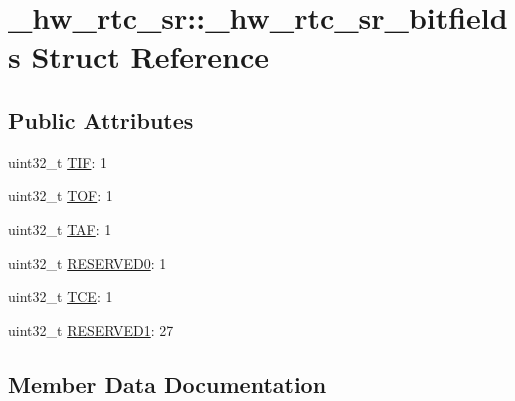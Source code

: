 \hypertarget{struct__hw__rtc__sr_1_1__hw__rtc__sr__bitfields}{}\section{\+\_\+hw\+\_\+rtc\+\_\+sr\+:\+:\+\_\+hw\+\_\+rtc\+\_\+sr\+\_\+bitfields Struct Reference}
\label{struct__hw__rtc__sr_1_1__hw__rtc__sr__bitfields}
\subsection*{Public Attributes}
\begin{DoxyCompactItemize}
\item 
uint32\+\_\+t \hyperlink{struct__hw__rtc__sr_1_1__hw__rtc__sr__bitfields_a3ba25655eeaea4c73c9d8bc551d02dcd}{T\+IF}\+: 1
\item 
uint32\+\_\+t \hyperlink{struct__hw__rtc__sr_1_1__hw__rtc__sr__bitfields_ab723f1615abdd527ae6545a38756bcca}{T\+OF}\+: 1
\item 
uint32\+\_\+t \hyperlink{struct__hw__rtc__sr_1_1__hw__rtc__sr__bitfields_ad7adaf9c80a80b1ff3aef2bbb3ef3e2f}{T\+AF}\+: 1
\item 
uint32\+\_\+t \hyperlink{struct__hw__rtc__sr_1_1__hw__rtc__sr__bitfields_a15048f8b349805e15afc8716d9aec88f}{R\+E\+S\+E\+R\+V\+E\+D0}\+: 1
\item 
uint32\+\_\+t \hyperlink{struct__hw__rtc__sr_1_1__hw__rtc__sr__bitfields_a84c35e27b61dd7eb1bbaa590fce35486}{T\+CE}\+: 1
\item 
uint32\+\_\+t \hyperlink{struct__hw__rtc__sr_1_1__hw__rtc__sr__bitfields_a91f9c76b5c91c5c47f230227743fa8ad}{R\+E\+S\+E\+R\+V\+E\+D1}\+: 27
\end{DoxyCompactItemize}


\subsection{Member Data Documentation}
